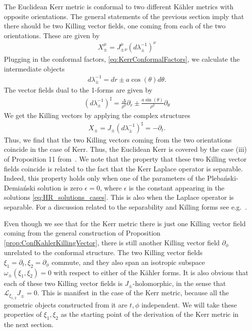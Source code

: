 \documentclass[10pt]{report}
\newcommand{\pleb}[0]{Pleba\'nski}
\newcommand{\demi}[0]{Demia\'nski}
\theoremstyle{definition}
\begin{document}
The Euclidean Kerr metric is conformal to two different K\"ahler metrics with opposite orientations. The general statements of the previous section imply that there should be two Killing vector fields, one coming from each of the two orientations. These are given by 
\begin{align}
    X_\pm^\mu = J_\pm^\mu{}_\nu (d\lambda_\pm^{-1})^\nu
\end{align}
Plugging in the conformal factors, \cref{eq:KerrConformalFactors}, we calculate the intermediate objects
\begin{align}
    d\lambda_\pm^{-1} = dr \pm a \cos(\theta) d\theta.
\end{align}
The vector fields dual to the 1-forms are given by 
\begin{align}
    (d\lambda_\pm^{-1})^\sharp = \frac{\Delta}{\rho^2} \partial_r \pm \frac{a \sin(\theta)}{\rho^2} \partial_\theta
\end{align}
We get the Killing vectors by applying the complex structures
\begin{align}
    X_\pm = J_\pm (d\lambda_\pm^{-1})^\sharp = -\partial_t.
\end{align}
Thus, we find that the two Killing vectors coming from the two orientations coincide in the case of Kerr. Thus, the Euclidean Kerr is covered by the case (iii) of Proposition 11 from~\cite{AmbitoricGeomeAposto2013}. We note that the property that these two Killing vector fields coincide is related to the fact that the Kerr Laplace operator is separable. Indeed, this property holds only when one of the parameters of the \pleb{}-\demi{} solution is zero $\epsilon=0$, where $\epsilon$ is the constant appearing in the solutions \cref{eq:HR_solutions_cases}. This is also when the Laplace operator is separable. For a discussion related to the separability and Killing forms see e.g.~\cite{Killing2FormsGauduc2017}.

Even though we see that for the Kerr metric there is just one Killing vector field coming from the general construction of Proposition \ref{prop:ConfKahlerKillingVector}, there is still another Killing vector field $\partial_\phi$ unrelated to the conformal structure. The two Killing vector fields $\xi_1=\partial_t, \xi_2=\partial_\phi$ commute, and they also span an isotropic subspace $\omega_\pm(\xi_1,\xi_2)=0$ with respect to either of the K\"ahler forms.
It is also obvious that each of these two Killing vector fields is $J_\pm$-holomorphic, in the sense that ${\mathcal L}_{\xi_{1,2}} J_\pm=0$. This is manifest in the case of the Kerr metric, because all the geometric objects constructed from it are $t,\phi$ independent. We will take these properties of $\xi_1,\xi_2$ as the starting point of the derivation of the Kerr metric in the next section. 
\end{document}
